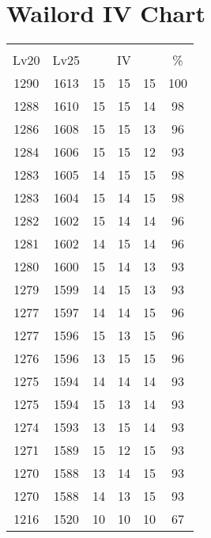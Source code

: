 \documentclass{article}%
\begin{document}
%
\normalsize%
\section{Wailord IV Chart}%
\label{sec:Wailord IV Chart}%
\renewcommand{\arraystretch}{1.5}%
\begin{tabular}{|c|c|c|c|c|c|}%
\hline%
\multicolumn{6}{|c|}{\textcolor{white}{ 
\linebreak{Wailord}
}%
\cellcolor{black}}\\%
\multicolumn{1}{|c}{Lv20}&\multicolumn{1}{c|}{Lv25}&\multicolumn{3}{c|}{IV}&\multicolumn{1}{|c|}{\%}\\%
\hline%
\rowcolor{color100}%
1290&1613&15&15&15&100\\%
\hline%
\rowcolor{color98}%
1288&1610&15&15&14&98\\%
\hline%
\rowcolor{color96}%
1286&1608&15&15&13&96\\%
\hline%
\rowcolor{color93}%
1284&1606&15&15&12&93\\%
\hline%
\rowcolor{color98}%
1283&1605&14&15&15&98\\%
\hline%
\rowcolor{color98}%
1283&1604&15&14&15&98\\%
\hline%
\rowcolor{color96}%
1282&1602&15&14&14&96\\%
\hline%
\rowcolor{color96}%
1281&1602&14&15&14&96\\%
\hline%
\rowcolor{color93}%
1280&1600&15&14&13&93\\%
\hline%
\rowcolor{color93}%
1279&1599&14&15&13&93\\%
\hline%
\rowcolor{color96}%
1277&1597&14&14&15&96\\%
\hline%
\rowcolor{color96}%
1277&1596&15&13&15&96\\%
\hline%
\rowcolor{color96}%
1276&1596&13&15&15&96\\%
\hline%
\rowcolor{color93}%
1275&1594&14&14&14&93\\%
\hline%
\rowcolor{color93}%
1275&1594&15&13&14&93\\%
\hline%
\rowcolor{color93}%
1274&1593&13&15&14&93\\%
\hline%
\rowcolor{color93}%
1271&1589&15&12&15&93\\%
\hline%
\rowcolor{color93}%
1270&1588&13&14&15&93\\%
\hline%
\rowcolor{color93}%
1270&1588&14&13&15&93\\%
\hline%
\rowcolor{color91}%
1216&1520&10&10&10&67\\%
\end{tabular}

%
\end{document}
